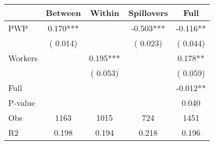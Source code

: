 
\begin{tabular}{l*{4}{c}}\hline&\multicolumn{1}{c}{Between}&\multicolumn{1}{c}{Within}&\multicolumn{1}{c}{Spillovers}&\multicolumn{1}{c}{Full}\\ \hline
 PWP           &              0.170***      &                                               &       -0.503*** &        -0.116**                            \\ 
                               &        (       0.014)           &                                       &       (       0.023)     &      (       0.044)                                           \\ 
 Workers       &                                               &        0.195***    &                                &             0.178**                            \\ 
                               &                                               & (       0.053)                  &                                        &      (       0.059)                                           \\ 
\hline                                                                                                                                                                                                                                            
 Full                  &                                               &                                               &                                        &            -0.012**                                     \\ 
 P-value               &                                               &                                               &                                        &             0.040                                           \\ 
 Obs                   &               1163               &       1015                       &       724                &              1451                                               \\ 
 R2                    &                      0.198              &              0.194                      &              0.218               &                     0.196                                              \\ 
\hline \end{tabular}                                                                                                                                                                                                              